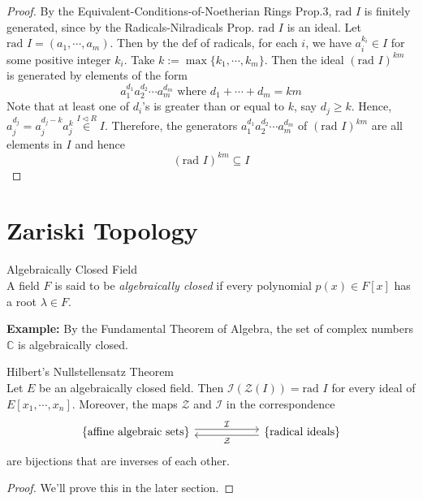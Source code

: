 \begin{proof}
    By the Equivalent-Conditions-of-Noetherian Rings Prop.3, $\text{rad }I$ is finitely generated, since by the Radicals-Nilradicals Prop. $\text{rad }I$ is an ideal. Let $\text{rad }I= (a_1 ,\cdots, a_m)$. Then by the def of radicals, for each $i$, we have $a_i^{k_i} \in I$ for some positive integer $k_i$. Take $k:= \max\{ k_1 ,\cdots, k_m\}$. Then the ideal $(\text{rad }I)^{km}$ is generated by elements of the form
    \[
    a_1^{d_1}a_2^{d_2} \cdots a_m^{d_m} \text{ where } d_1+ \cdots +d_m =km
    \]
    Note that at least one of $d_i$'s is greater than or equal to $k$, say $d_j \geq k$. Hence, $a_j^{d_j}= a_j^{d_j-k} a_j^k \overset{I \triangleleft R}{\in } I$. Therefore, the generators $a_1^{d_1}a_2^{d_2} \cdots a_m^{d_m}$ of $(\text{rad }I)^{km}$ are all elements in $I$ and hence
    $$(\text{rad }I)^{km} \subseteq I$$
\end{proof}

\section{Zariski Topology}

\begin{definition}{Algebraically Closed Field}\\
A field $F$ is said to be \textit{algebraically closed} if every polynomial $p(x) \in F[x]$ has a root $\lambda \in F$.
\end{definition}

\noindent\textbf{Example:} By the Fundamental Theorem of Algebra, the set of complex numbers $\mathbb{C}$ is algebraically closed.

\begin{theorem}{Hilbert's Nullstellensatz Theorem}\\
Let $E$ be an algebraically closed field. Then $\mathcal{I}(\mathcal{Z}(I)) =\text{rad }I$ for every ideal of $E[x_1 ,\cdots, x_n]$. Moreover, the maps $\mathcal{Z}$ and $\mathcal{I}$ in the correspondence
\[
\begin{tikzcd}[column sep=2cm]
\{\text{affine algebraic sets}\} \arrow[r, shift left=0.6ex, "\mathcal{I}"] & \{\text{radical ideals}\} \arrow[l, shift left=0.6ex, "\mathcal{Z}"]
\end{tikzcd}
\]
are bijections that are inverses of each other.
\end{theorem}

\begin{proof}
    We'll prove this in the later section.
\end{proof}

